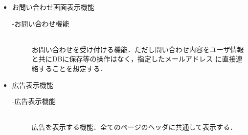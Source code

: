 \documentclass[11pt]{jsreport}
\begin{document}
\begin{itemize}
\begin{description}
    \end{description}
    \item お問い合わせ画面表示機能
    \begin{description}
        \item[-お問い合わせ機能]\mbox{}\\
            お問い合わせを受け付ける機能．ただし問い合わせ内容をユーザ情報と共にDBに保存等の操作はなく，指定したメールアドレス
            に直接連絡することを想定する． 
    \end{description}
    \item 広告表示機能
    \begin{description}
        \item[-広告表示機能]\mbox{}\\
            広告を表示する機能．全てのページのヘッダに共通して表示する． 
    \end{description}
\end{itemize}  

\clearpage
\end{document}
